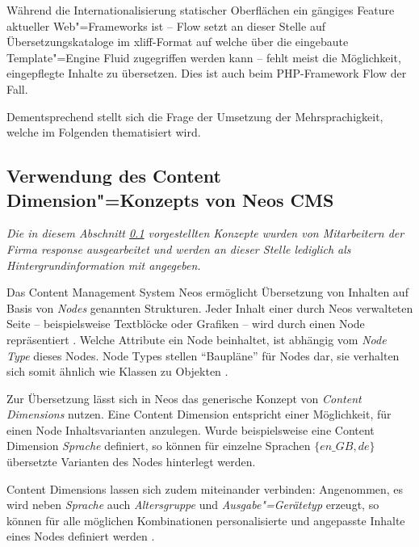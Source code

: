 Während die Internationalisierung statischer Oberflächen ein gängiges Feature aktueller Web"=Frameworks ist -- Flow setzt an dieser Stelle auf Übersetzungskataloge im xliff-Format auf welche über die eingebaute Template"=Engine Fluid zugegriffen werden kann \cite[S. 278, 280f]{TheNeosTeam.2015} -- fehlt meist die Möglichkeit, eingepflegte Inhalte zu übersetzen. Dies ist auch beim PHP-Framework Flow der Fall.

Dementsprechend stellt sich die Frage der Umsetzung der Mehrsprachigkeit, welche im Folgenden thematisiert wird.

\subsection{Verwendung des Content Dimension"=Konzepts von Neos CMS}
\label{sec:ReEvent.Language.Nodes}

\begin{center}
\parbox{0.9\textwidth}{
\itshape
\small
Die in diesem Abschnitt \ref{sec:ReEvent.Language.Nodes} vorgestellten Konzepte wurden von Mitarbeitern der Firma response ausgearbeitet und werden an dieser Stelle lediglich als Hintergrundinformation mit angegeben.
}
\end{center}

Das Content Management System Neos ermöglicht Übersetzung von Inhalten auf Basis von \emph{Nodes} genannten Strukturen. Jeder Inhalt einer durch Neos verwalteten Seite -- beispielsweise Textblöcke oder Grafiken -- wird durch einen Node repräsentiert \cite[S. 15f]{TheNeosTeam.2015b}. Welche Attribute ein Node beinhaltet, ist abhängig vom \emph{Node Type} dieses Nodes. Node Types stellen \enquote{Baupläne} für Nodes dar, sie verhalten sich somit ähnlich wie Klassen zu Objekten \cite[S. 15f]{TheNeosTeam.2015b}.

Zur Übersetzung lässt sich in Neos das generische Konzept von \emph{Content Dimensions} nutzen. Eine Content Dimension entspricht einer Möglichkeit, für einen Node Inhaltsvarianten anzulegen. Wurde beispielsweise eine Content Dimension \emph{Sprache} definiert, so können für einzelne Sprachen $\{en\_GB,de\}$ übersetzte Varianten des Nodes hinterlegt werden.

Content Dimensions lassen sich zudem miteinander verbinden: Angenommen, es wird  neben \emph{Sprache} auch \emph{Altersgruppe} und \emph{Ausgabe"=Gerätetyp} erzeugt, so können für alle möglichen Kombinationen personalisierte und angepasste Inhalte eines Nodes definiert werden \cite[S. 60]{TheNeosTeam.2015b}.



